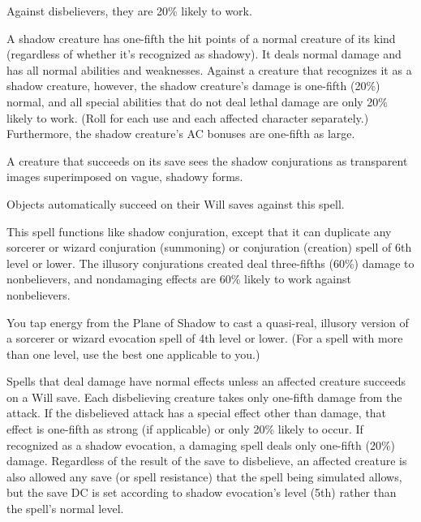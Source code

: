 \begin{multicols}{2}
\begin{small}
\smallskip\noindent Against disbelievers, they are 20\% likely to work.

\smallskip\noindent A shadow creature has one-fifth the hit points of a normal creature of its kind (regardless of whether it's recognized as shadowy). It deals normal damage and has all normal abilities and weaknesses. Against a creature that recognizes it as a shadow creature, however, the shadow creature's damage is one-fifth (20\%) normal, and all special abilities that do not deal lethal damage are only 20\% likely to work. (Roll for each use and each affected character separately.) Furthermore, the shadow creature's AC bonuses are one-fifth as large.

\smallskip\noindent A creature that succeeds on its save sees the shadow conjurations as transparent images superimposed on vague, shadowy forms.

\smallskip\noindent Objects automatically succeed on their Will saves against this spell.

\noindent This spell functions like shadow conjuration, except that it can duplicate any sorcerer or wizard conjuration (summoning) or conjuration (creation) spell of 6th level or lower. The illusory conjurations created deal three-fifths (60\%) damage to nonbelievers, and nondamaging effects are 60\% likely to work against nonbelievers.

\smallskip\noindent You tap energy from the Plane of Shadow to cast a quasi-real, illusory version of a sorcerer or wizard evocation spell of 4th level or lower. (For a spell with more than one level, use the best one applicable to you.)

\smallskip\noindent Spells that deal damage have normal effects unless an affected creature succeeds on a Will save. Each disbelieving creature takes only one-fifth damage from the attack. If the disbelieved attack has a special effect other than damage, that effect is one-fifth as strong (if applicable) or only 20\% likely to occur. If recognized as a shadow evocation, a damaging spell deals only one-fifth (20\%) damage. Regardless of the result of the save to disbelieve, an affected creature is also allowed any save (or spell resistance) that the spell being simulated allows, but the save DC is set according to shadow evocation's level (5th) rather than the spell's normal level.


\end{small}
\end{multicols}
